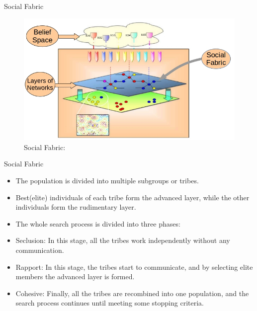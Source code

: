 \documentclass[table]{beamer}
\begin{document}
	\begin{frame}{Social Fabric}
		\begin{figure}[v]
			\includegraphics[scale=0.57]{socialfabric2}
			\centering
			\caption{Social Fabric: \cite{reynolds2010weaving}}
			\label{ref:socialfabric}
		\end{figure}		
	\end{frame}
	
	\begin{frame}{Social Fabric}
		\begin{block}{}
			\begin{itemize}
				\item The population is divided into multiple subgroups or \alert{tribes}. \cite{ali2016leveraged}
				\item Best(elite) individuals of each tribe form the advanced layer, while the other individuals form the rudimentary layer.
			\end{itemize}
		\end{block}
		\begin{block}{}
			\begin{itemize}
				\item The whole search process is divided into three phases:
				\item Seclusion: In this stage, all the tribes work independently without any communication.
				\item Rapport: In this stage, the tribes start to communicate, and by selecting elite members the advanced layer is formed.
				\item Cohesive: Finally, all the tribes are recombined into one population, and the search process continues until meeting some stopping criteria.
			\end{itemize}
		\end{block}
	\end{frame}
	
\end{document}
